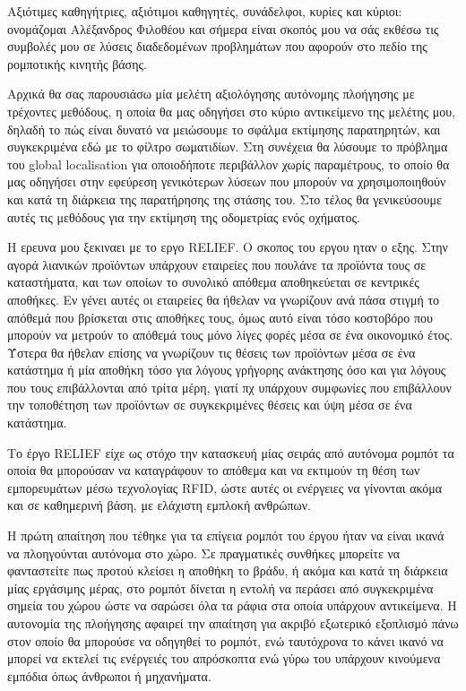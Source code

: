 \documentclass[a4paper,10pt]{article}
\begin{document}
Αξιότιμες καθηγήτριες, αξιότιμοι καθηγητές, συνάδελφοι, κυρίες και κύριοι:
ονομάζομαι Αλέξανδρος Φιλοθέου και σήμερα είναι σκοπός μου να σάς εκθέσω τις
συμβολές μου σε λύσεις διαδεδομένων προβλημάτων που αφορούν στο πεδίο της
ρομποτικής κινητής βάσης.

Αρχικά θα σας παρουσιάσω μία μελέτη αξιολόγησης αυτόνομης πλοήγησης με
τρέχοντες μεθόδους, η οποία θα μας οδηγήσει στο κύριο αντικείμενο της μελέτης
μου, δηλαδή το πώς είναι δυνατό να μειώσουμε το σφάλμα εκτίμησης παρατηρητών,
και συγκεκριμένα εδώ με το φίλτρο σωματιδίων. Στη συνέχεια θα λύσουμε το
πρόβλημα του global localisation για οποιοδήποτε περιβάλλον χωρίς παραμέτρους,
το οποίο θα μας οδηγήσει στην εφεύρεση γενικότερων λύσεων που μπορούν να
χρησιμοποιηθούν και κατά τη διάρκεια της παρατήρησης της στάσης του. Στο τέλος
θα γενικεύσουμε αυτές τις μεθόδους για την εκτίμηση της οδομετρίας ενός
οχήματος.

Η ερευνα μου ξεκιναει με το εργο RELIEF. Ο σκοπος του εργου ηταν ο εξης. Στην
αγορά λιανικών προϊόντων υπάρχουν εταιρείες που πουλάνε τα προϊόντα τους σε
καταστήματα, και των οποίων το συνολικό απόθεμα αποθηκεύεται σε κεντρικές
αποθήκες. Εν γένει αυτές οι εταιρείες θα ήθελαν να γνωρίζουν ανά πάσα στιγμή το
απόθεμά που βρίσκεται στις αποθήκες τους, όμως αυτό είναι τόσο κοστοβόρο που
μπορούν να μετρούν το απόθεμά τους μόνο λίγες φορές μέσα σε ένα οικονομικό
έτος. Ύστερα θα ήθελαν επίσης να γνωρίζουν τις θέσεις των προϊόντων μέσα σε ένα
κατάστημα ή μία αποθήκη τόσο για λόγους γρήγορης ανάκτησης όσο και για λόγους
που τους επιβάλλονται από τρίτα μέρη, γιατί πχ υπάρχουν συμφωνίες που
επιβάλλουν την τοποθέτηση των προϊόντων σε συγκεκριμένες θέσεις και ύψη μέσα σε
ένα κατάστημα.

Το έργο RELIEF είχε ως στόχο την κατασκευή μίας σειράς από αυτόνομα ρομπότ τα
οποία θα μπορούσαν να καταγράφουν το απόθεμα και να εκτιμούν τη θέση των
εμπορευμάτων μέσω τεχνολογίας RFID, ώστε αυτές οι ενέργειες να γίνονται ακόμα
και σε καθημερινή βάση, με ελάχιστη εμπλοκή ανθρώπων.

Η πρώτη απαίτηση που τέθηκε για τα επίγεια ρομπότ του έργου ήταν να είναι ικανά
να πλοηγούνται αυτόνομα στο χώρο. Σε πραγματικές συνθήκες μπορείτε να
φανταστείτε πως προτού κλείσει η αποθήκη το βράδυ, ή ακόμα και κατά τη διάρκεια
μίας εργάσιμης μέρας, στο ρομπότ δίνεται η εντολή να περάσει από συγκεκριμένα
σημεία του χώρου ώστε να σαρώσει όλα τα ράφια στα οποία υπάρχουν αντικείμενα.
Η αυτονομία της πλοήγησης αφαιρεί την απαίτηση για ακριβό εξωτερικό εξοπλισμό
πάνω στον οποίο θα μπορούσε να οδηγηθεί το ρομπότ, ενώ ταυτόχρονα το κάνει
ικανό να μπορεί να εκτελεί τις ενέργειές του απρόσκοπτα ενώ γύρω του υπάρχουν
κινούμενα εμπόδια όπως άνθρωποι ή μηχανήματα.
\end{document}
